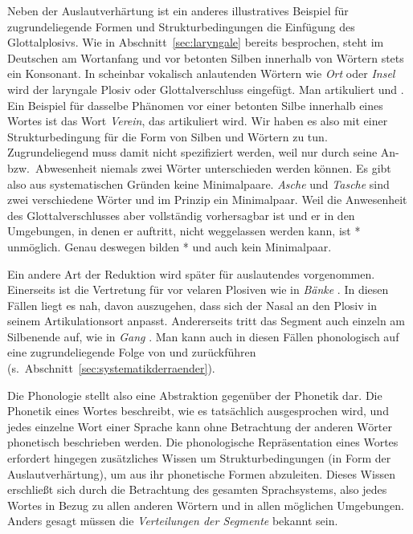 Neben der Auslautverhärtung ist ein anderes illustratives Beispiel für zugrundeliegende Formen und Strukturbedingungen die Einfügung des Glottalplosivs.
Wie in Abschnitt~\ref{sec:laryngale} bereits besprochen, steht im Deutschen am Wortanfang und vor betonten Silben innerhalb von Wörtern stets ein Konsonant.
In scheinbar vokalisch anlautenden Wörtern wie \textit{Ort} oder \textit{Insel} wird der laryngale Plosiv oder Glottalverschluss \textipa{[P]} eingefügt.
Man artikuliert \textipa{[P\t{O@}t]} und \textipa{[PInz@l]}.
Ein Beispiel für dasselbe Phänomen vor einer betonten Silbe innerhalb eines Wortes ist das Wort \textit{Verein}, das \textipa{[f5P\t{aE}n]} artikuliert wird.
Wir haben es also mit einer Strukturbedingung für die Form von Silben und Wörtern zu tun.
Zugrundeliegend muss \textipa{[P]} damit nicht spezifiziert werden, weil nur durch seine An- bzw.\ Abwesenheit niemals zwei Wörter unterschieden werden können.
Es gibt also aus systematischen Gründen keine Minimalpaare.
\textit{Asche} \textipa{[PaS@]} und \textit{Tasche} \textipa{[taS@]} sind zwei verschiedene Wörter und im Prinzip ein Minimalpaar.
Weil die Anwesenheit des Glottalverschlusses aber vollständig vorhersagbar ist und er in den Umgebungen, in denen er auftritt, nicht weggelassen werden kann, ist *\textipa{[aS@]} unmöglich.
Genau deswegen bilden *\textipa{[aS@]} und \textipa{[PaS@]} auch kein Minimalpaar.

Ein andere Art der Reduktion wird später für auslautendes \textipa{[N]} vorgenommen.
Einerseits ist \textipa{[N]} die Vertretung für \textipa{[n]} vor velaren Plosiven wie in \textit{Bänke} \textipa{[bENk@]}.
In diesen Fällen liegt es nah, davon auszugehen, dass sich der Nasal an den Plosiv in seinem Artikulationsort anpasst.
Andererseits tritt das Segment auch einzeln am Silbenende auf, wie in \textit{Gang} \textipa{[gaN]}.
Man kann \textipa{[N]} auch in diesen Fällen phonologisch auf eine zugrundeliegende Folge von \textipa{[n]} und \textipa{[g]} zurückführen (s.\ Abschnitt~\ref{sec:systematikderraender}).

Die Phonologie stellt also eine Abstraktion gegenüber der Phonetik dar.
Die Phonetik eines Wortes beschreibt, wie es tatsächlich ausgesprochen wird, und jedes einzelne Wort einer Sprache kann ohne Betrachtung der anderen Wörter phonetisch beschrieben werden.
Die phonologische Repräsentation eines Wortes erfordert hingegen zusätzliches Wissen um Strukturbedingungen (\zB in Form der Auslautverhärtung), um aus ihr phonetische Formen abzuleiten.
Dieses Wissen erschließt sich durch die Betrachtung des gesamten Sprachsystems, also jedes Wortes in Bezug zu allen anderen Wörtern und in allen möglichen Umgebungen.
Anders gesagt müssen die \textit{Verteilungen der Segmente} bekannt sein.

